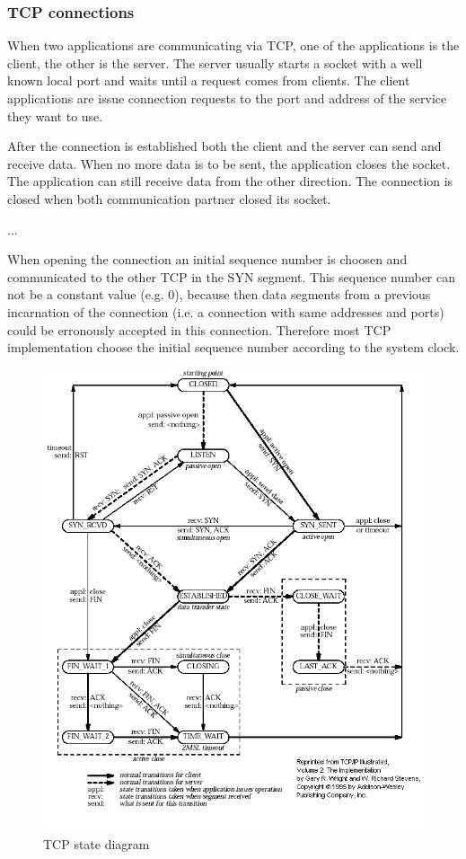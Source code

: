 \subsubsection{TCP connections}

When two applications are communicating via TCP, one of the applications is the client,
the other is the server. The server usually starts a socket with a well known local port
and waits until a request comes from clients. The client applications are issue connection
requests to the port and address of the service they want to use.

After the connection is established both the client and the server can send and receive data.
When no more data is to be sent, the application closes the socket. The application can still
receive data from the other direction. The connection is closed when both communication partner
closed its socket.

...

When opening the connection an initial sequence number is choosen and communicated to the
other TCP in the SYN segment. This sequence number can not be a constant value (e.g. 0),
because then data segments from a previous incarnation of the connection (i.e. a connection
with same addresses and ports) could be erronously accepted in this connection. Therefore
most TCP implementation choose the initial sequence number according to the system clock.


\begin{figure}
\includegraphics[width=\textwidth]{figures/tcpstate}
\caption{TCP state diagram}
\label{fig:tcp_states}
\end{figure}

